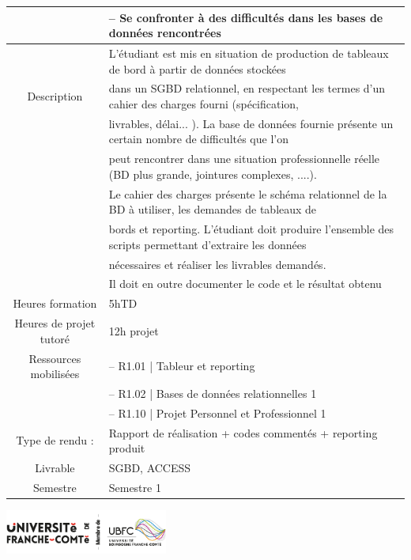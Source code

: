 \documentclass[10pt, a4paper]{article}
\begin{document}
\begin{titlepage}
\begin{center}
\begin{tabular}{|c|l|}
                & – Se confronter à des difficultés dans les bases de données rencontrées\\ \hline
                & L’étudiant est mis en situation de production de tableaux de bord à partir de données stockées \\
               Description & dans un SGBD relationnel, en respectant les termes d’un cahier des charges fourni (spécification,\\
                & livrables, délai... ). La base de données fournie présente un certain nombre de difficultés que l’on \\
                & peut rencontrer dans une situation professionnelle réelle (BD plus grande, jointures complexes, ....).\\
                & Le cahier des charges présente le schéma relationnel de la BD à utiliser, les demandes de tableaux de \\
                & bords et reporting. L’étudiant doit produire l’ensemble des scripts permettant d’extraire les données \\
                &nécessaires et réaliser les livrables demandés.\\
                &Il doit en outre documenter le code et le résultat obtenu\\ \hline
                Heures formation&5hTD\\\hline
                Heures de projet tutoré&12h projet\\\hline
                Ressources mobilisées&– R1.01 | Tableur et reporting\\
                &– R1.02 | Bases de données relationnelles 1\\
                &– R1.10 | Projet Personnel et Professionnel 1\\\hline
                Type de rendu : & Rapport de réalisation + codes commentés + reporting produit\\
                Livrable  & SGBD, ACCESS\\\hline
                Semestre&Semestre 1\\\hline
        \end{tabular} 
        \vfill
        
            
            
        \includegraphics[width=0.4\textwidth]{logo.png}
        \\
            
    \end{center}
\end{titlepage}
\end{document}
